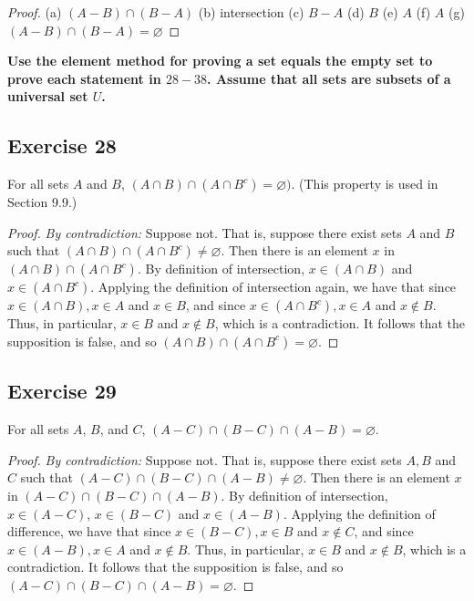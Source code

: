 \documentclass[14pt]{extarticle}
\newcommand{\es}{\varnothing}
\newcommand{\cy}{\color{cyan}}
\begin{document}
\begin{proof}
(a) \((A - B) \cap (B - A)\) (b) intersection (c) $B - A$ (d) $B$ (e) $A$ (f) $A$ (g) \((A - B) \cap (B - A) = \es\)
\end{proof}

{\bf \cy Use the element method for proving a set equals the empty set to prove each statement in $28-38$. Assume that all sets are subsets of a universal set $U$.}

\subsection{Exercise 28}
For all sets $A$ and $B$, \((A \cap B) \cap (A \cap B^c) = \es)\). (This property is used in Section 9.9.)

\begin{proof}
{\it By contradiction:} Suppose not. That is, suppose there exist sets $A$ and $B$ such that \((A \cap B) \cap (A 
\cap B^c) \neq \es\). Then there is an element $x$ in \((A \cap B) \cap (A \cap B^c)\). By definition of intersection, 
\(x \in (A \cap B)\) and \(x \in (A \cap B^c)\). Applying the definition of intersection again, we have that since 
\(x \in (A \cap B), x \in A\) and \(x \in B\), and since \(x \in (A \cap B^c), x \in A\) and \(x \notin B\). Thus, in 
particular, \(x \in B\) and \(x \notin B\), which is a contradiction. It follows that the supposition is false, 
and so \((A \cap B) \cap (A \cap B^c) = \es\).
\end{proof}

\subsection{Exercise 29}
For all sets $A$, $B$, and $C$, \((A - C) \cap (B - C) \cap (A - B) = \es\).

\begin{proof}
{\it By contradiction:} Suppose not. That is, suppose there exist sets $A, B$ and $C$ such that \((A - C) \cap (B - C) 
\cap (A - B) \neq \es\). Then there is an element $x$ in \((A - C) \cap (B - C) \cap (A - B)\). By definition of 
intersection, \(x \in (A - C)\), \(x \in (B - C)\) and \(x \in (A - B)\). Applying the definition of difference, we 
have that since \(x \in (B - C), x \in B\) and \(x \notin C\), and since \(x \in (A - B), x \in A\) and \(x \notin 
B\). Thus, in particular, \(x \in B\) and \(x \notin B\), which is a contradiction. It follows that the supposition 
is false, and so \((A - C) \cap (B - C) \cap (A - B) = \es\).
\end{proof}
\end{document}
